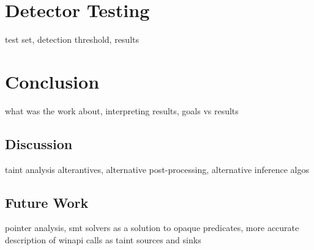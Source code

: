 \chapter{Detector Testing}
\label{ch_testing}
test set, detection threshold, results
\chapter{Conclusion}
\label{ch_conclusion}
what was the work about, interpreting results, goals vs results
\section{Discussion}
taint analysis alterantives, alternative post-processing, alternative inference algos
\section{Future Work}
pointer analysis, smt solvers as a solution to opaque predicates, more accurate description of winapi calls as taint sources and sinks

